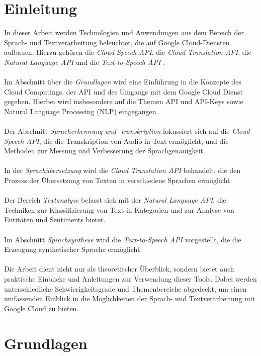 \documentclass[12pt,a4paper]{article}
\begin{document}
\section*{Einleitung}
In dieser Arbeit werden Technologien und Anwendungen aus dem Bereich der Sprach- und Textverarbeitung beleuchtet, die auf Google Cloud-Diensten aufbauen. Hierzu gehören die \textit{Cloud Speech API}, die \textit{Cloud Translation API}, die \textit{Natural Language API} und die \textit{Text-to-Speech API} \cite{googlecloudskills2023}.
\\ \\
Im Abschnitt über die \textit{Grundlagen} wird eine Einführung in die Konzepte des Cloud Computings, der API und des Umgangs mit dem Google Cloud Dienst gegeben. Hierbei wird insbesondere auf die Themen API und API-Keys sowie Natural Language Processing (NLP) eingegangen.
\\ \\
Der Abschnitt \textit{Spracherkennung und -transkription} fokussiert sich auf die \textit{Cloud Speech API}, die die Transkription von Audio in Text ermöglicht, und die Methoden zur Messung und Verbesserung der Sprachgenauigkeit.
\\ \\
In der \textit{Sprachübersetzung} wird die \textit{Cloud Translation API} behandelt, die den Prozess der Übersetzung von Texten in verschiedene Sprachen ermöglicht.
\\ \\
Der Bereich \textit{Textanalyse} befasst sich mit der \textit{Natural Language API}, die Techniken zur Klassifizierung von Text in Kategorien und zur Analyse von Entitäten und Sentiments bietet.
\\ \\
Im Abschnitt \textit{Sprachsynthese} wird die \textit{Text-to-Speech API} vorgestellt, die die Erzeugung synthetischer Sprache ermöglicht.
\\ \\
Die Arbeit dient nicht nur als theoretischer Überblick, sondern bietet auch praktische Einblicke und Anleitungen zur Verwendung dieser Tools. Dabei werden unterschiedliche Schwierigkeitsgrade und Themenbereiche abgedeckt, um einen umfassenden Einblick in die Möglichkeiten der Sprach- und Textverarbeitung mit Google Cloud zu bieten.

	
\newpage

\section{Grundlagen}
\end{document}
